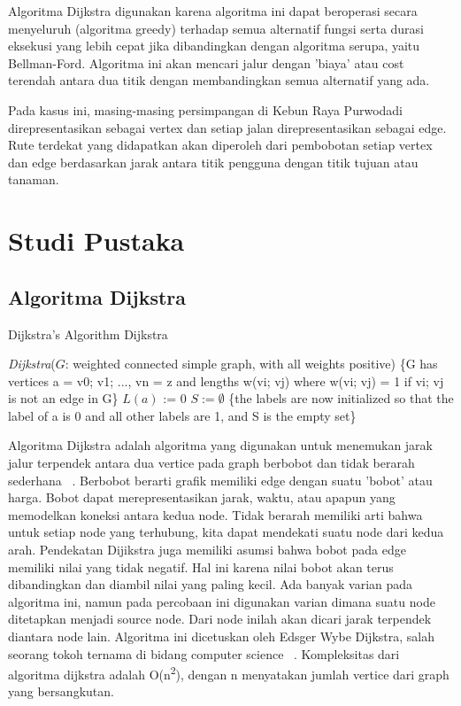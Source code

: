 \documentclass [conference] {IEEEtran}
\begin{document}
Algoritma Dijkstra digunakan karena algoritma ini dapat beroperasi secara menyeluruh (algoritma greedy) terhadap semua alternatif fungsi serta durasi eksekusi yang lebih cepat jika dibandingkan dengan algoritma serupa, yaitu Bellman-Ford. Algoritma ini akan mencari jalur dengan ’biaya’ atau cost terendah antara dua titik dengan membandingkan semua alternatif yang ada. 

Pada kasus ini, masing-masing persimpangan di Kebun Raya Purwodadi direpresentasikan sebagai vertex dan setiap jalan direpresentasikan sebagai edge. Rute terdekat yang didapatkan akan diperoleh dari pembobotan setiap vertex dan edge berdasarkan jarak antara titik pengguna dengan titik tujuan atau tanaman.

\section{Studi Pustaka}
\subsection{Algoritma Dijkstra}
\begin{algorithm}
\caption{Dijkstra's Algorithm {\selectfont Dijkstra}}\label{alg:two}
 \textit{Dijkstra}($G$: weighted connected simple graph, with all weights positive)\;
\{G has vertices a = v0; v1; ..., vn = z and lengths w(vi; vj) where w(vi; vj) = 1 if vi; vj is not an edge in G\}\;
$L(a)$ := 0\;
$S := \emptyset$\;
\{the labels are now initialized so that the label of a is 0 and all other labels are 1, and S is the empty set\}\;
\end{algorithm}
Algoritma Dijkstra adalah algoritma yang digunakan untuk menemukan jarak jalur terpendek antara dua vertice pada graph berbobot dan tidak berarah sederhana ~\cite{rosen2012discrete}. Berbobot berarti grafik memiliki edge dengan suatu ’bobot’ atau harga. Bobot dapat merepresentasikan jarak, waktu, atau apapun yang memodelkan koneksi antara kedua node. Tidak berarah memiliki arti bahwa untuk setiap node yang terhubung, kita dapat mendekati suatu node dari kedua arah. Pendekatan Dijikstra juga memiliki asumsi bahwa bobot pada edge memiliki nilai yang tidak negatif. Hal ini karena nilai bobot akan terus dibandingkan dan diambil nilai yang paling kecil. Ada banyak varian pada algoritma ini, namun pada percobaan ini digunakan varian dimana suatu node ditetapkan menjadi source node. Dari node inilah akan dicari jarak terpendek diantara node lain. Algoritma ini dicetuskan oleh Edsger Wybe Dijkstra, salah seorang tokoh ternama di bidang computer science ~\cite{dijkstra1959note}. Kompleksitas dari algoritma dijkstra adalah O(n\textsuperscript{2}), dengan n menyatakan jumlah vertice dari graph yang bersangkutan.
\end{document}
